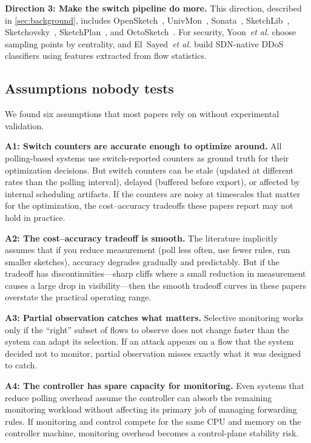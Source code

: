 \documentclass[letterpaper,twocolumn,10pt]{article}
\newcommand{\etal}{\textit{et al.}\xspace}
\newcommand{\para}[1]{\smallskip\noindent\textbf{#1.}}
\begin{document}
\para{Direction 3: Make the switch pipeline do more}
This direction, described in \cref{sec:background}, includes
OpenSketch~\cite{yu2013opensketch},
UnivMon~\cite{liu2016univmon},
Sonata~\cite{gupta2018sonata},
SketchLib~\cite{namkung2022sketchlib},
Sketchovsky~\cite{namkung2023sketchovsky},
SketchPlan~\cite{srivastava2024sketchplan}, and
OctoSketch~\cite{zhang2024octosketch}.
For security, Yoon~\etal\cite{yoon2017sampling} choose sampling
points by centrality, and
El~Sayed~\etal\cite{elsayed2022ddos} build SDN-native DDoS
classifiers using features extracted from flow statistics.

\subsection{Assumptions nobody tests}
\label{sec:assumptions}

We found six assumptions that most papers rely on without
experimental validation.

\para{A1: Switch counters are accurate enough to optimize around}
All polling-based systems use switch-reported counters as ground
truth for their optimization decisions. But switch counters can
be stale (updated at different rates than the polling interval),
delayed (buffered before export), or affected by internal
scheduling artifacts. If the counters are noisy at timescales
that matter for the optimization, the cost--accuracy tradeoffs
these papers report may not hold in practice.

\para{A2: The cost--accuracy tradeoff is smooth}
The literature implicitly assumes that if you reduce measurement
(poll less often, use fewer rules, run smaller sketches), accuracy
degrades gradually and predictably. But if the tradeoff has
discontinuities---sharp cliffs where a small reduction in
measurement causes a large drop in visibility---then the smooth
tradeoff curves in these papers overstate the practical operating
range.

\para{A3: Partial observation catches what matters}
Selective monitoring works only if the ``right'' subset of flows
to observe does not change faster than the system can adapt its
selection. If an attack appears on a flow that the system decided
not to monitor, partial observation misses exactly what it was
designed to catch.

\para{A4: The controller has spare capacity for monitoring}
Even systems that reduce polling overhead assume the controller
can absorb the remaining monitoring workload without affecting
its primary job of managing forwarding rules. If monitoring and
control compete for the same CPU and memory on the controller
machine, monitoring overhead becomes a control-plane stability
risk.
\end{document}
